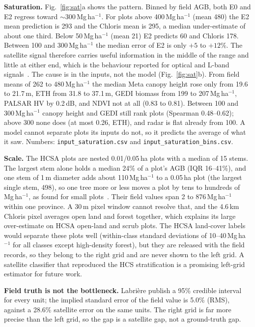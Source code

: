 \documentclass[conference,a4paper]{IEEEtran}
\begin{document}
\textbf{Saturation.} Fig.~\ref{fig:sat}a shows the pattern. Binned by field AGB, both E0 and E2 regress toward $\sim$300\,Mg\,ha$^{-1}$. For plots above 400\,Mg\,ha$^{-1}$ (mean 480) the E2 mean prediction is 293 and the Chloris mean is 295, a median under-estimate of about one third. Below 50\,Mg\,ha$^{-1}$ (mean 21) E2 predicts 60 and Chloris 178. Between 100 and 300\,Mg\,ha$^{-1}$ the median error of E2 is only $+5$ to $+12$\%. The satellite signal therefore carries useful information in the middle of the range and little at either end, which is the behaviour reported for optical and L-band signals~\cite{mitchard2009using,mermoz2015decrease,rejou2019upscaling}. The cause is in the inputs, not the model (Fig.~\ref{fig:sat}b). From field means of 262 to 480\,Mg\,ha$^{-1}$ the median Meta canopy height rose only from 19.6 to 21.7\,m, ETH from 31.8 to 37.1\,m, GEDI biomass from 199 to 207\,Mg\,ha$^{-1}$, PALSAR HV by 0.2\,dB, and NDVI not at all (0.83 to 0.81). Between 100 and 300\,Mg\,ha$^{-1}$ canopy height and GEDI still rank plots (Spearman 0.48--0.62); above 300 none does (at most 0.26, ETH), and radar is flat already from 100. A model cannot separate plots its inputs do not, so it predicts the average of what it saw. Numbers: \texttt{input\_saturation.csv} and \texttt{input\_saturation\_bins.csv}.

\textbf{Scale.} The HCSA plots are nested 0.01/0.05\,ha plots with a median of 15 stems. The largest stem alone holds a median 24\% of a plot's AGB (IQR 16--41\%), and one stem of 1\,m diameter adds about 110\,Mg\,ha$^{-1}$ to a 0.05\,ha plot (the largest single stem, 498), so one tree more or less moves a plot by tens to hundreds of Mg\,ha$^{-1}$, as found for small plots~\cite{chave2004error,rejou2014local}. Their field values span 2 to 876\,Mg\,ha$^{-1}$ within one province. A 30\,m pixel window cannot resolve that, and the 4.6\,km Chloris pixel averages open land and forest together, which explains its large over-estimate on HCSA open-land and scrub plots. The HCSA land-cover labels would separate these plots well (within-class standard deviations of 10--40\,Mg\,ha$^{-1}$ for all classes except high-density forest), but they are released with the field records, so they belong to the right grid and are never shown to the left grid. A satellite classifier that reproduced the HCS stratification is a promising left-grid estimator for future work.

\textbf{Field truth is not the bottleneck.} Labri\`ere publish a 95\% credible interval for every unit; the implied standard error of the field value is 5.0\% (RMS), against a 28.6\% satellite error on the same units. The right grid is far more precise than the left grid, so the gap is a satellite gap, not a ground-truth gap.
\end{document}
